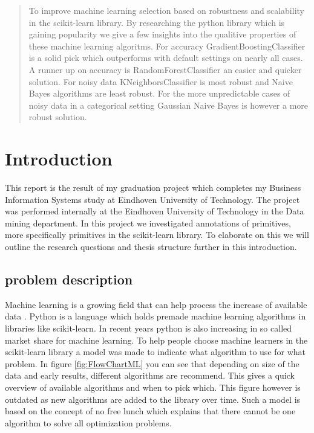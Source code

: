 \documentclass[a4paper,10pt]{article}
\begin{document}
\begin{abstract}
To improve machine learning selection based on robustness and scalability in the scikit-learn library. By researching the python library which is gaining popularity we give a few insights into the qualitive properties of these machine learning algoritms. For accuracy GradientBoostingClassifier is a solid pick which outperforms with default settings on nearly all cases. A runner up on accuracy is RandomForestClassifier an easier and quicker solution. For noisy data KNeighborsClassifier is most robust and Naive Bayes algorithms are least robust. For the more unpredictable cases of noisy data in a categorical setting Gaussian Naive Bayes is however a more robust solution.

\end{abstract}

\newpage
\tableofcontents
\newpage


\section{Introduction} \label{Chapter1}
This report is the result of my graduation project which completes my Business Information Systems study at Eindhoven University of Technology.
The project was performed internally at the Eindhoven University of Technology in the Data mining department.
In this project we investigated annotations of primitives, more specifically primitives in the scikit-learn library.
To elaborate on this we will outline the research questions and thesis structure further in this introduction.
 

\subsection{problem description}\label{Intr-Prob}
Machine learning is a growing field that can help process the increase of available data \cite{Big-data}\cite{ML-trends}. 
Python is a language which holds premade machine learning algorithms in libraries like scikit-learn\cite{scikit-learn}.
In recent years python is also increasing in so called market share for machine learning\cite{python-pop}.
To help people choose machine learners in the scikit-learn library a model was made to indicate what algorithm to use for what problem. In figure \ref{fig:FlowChartML} you can see that depending on size of the data and early results, different algorithms are recommend. This gives a quick overview of available algorithms and when to pick which. This figure however is outdated as new algorithms are added to the library over time. Such a model is based on the concept of no free lunch which explains that there cannot be one algorithm to solve all optimization problems\cite{No-Free-Lunch}.  
 
\end{document}
